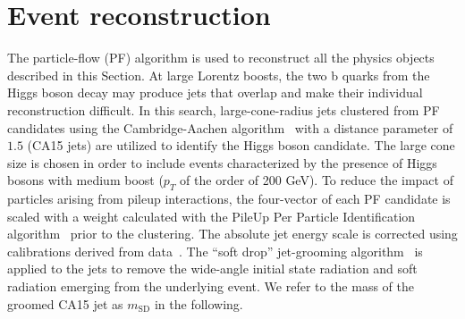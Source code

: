 


\section{Event reconstruction}

The particle-flow (PF) \cite{Sirunyan:2017ulk} algorithm is used to reconstruct all the physics objects described in this Section. At large Lorentz boosts, the two b quarks from the Higgs boson decay may produce jets that overlap and make their individual reconstruction difficult. In this search, large-cone-radius jets clustered from PF candidates using the Cambridge-Aachen algorithm~\cite{cajets} with a distance parameter of $1.5$ (CA15 jets) are utilized to identify the Higgs boson candidate.  The large cone size is chosen in order to include events characterized by the presence of Higgs bosons with medium boost ($p_T$ of the order of 200 GeV).
To reduce the impact of particles arising from pileup interactions,  the four-vector of each PF candidate is scaled with a weight calculated with the PileUp Per Particle Identification algorithm~\cite{puppi} prior to the clustering.
The absolute jet energy scale is corrected using calibrations derived from data~\cite{jec}.
The ``soft drop'' jet-grooming algorithm~\cite{msd} is applied to the jets to remove the wide-angle initial state radiation and soft radiation emerging from the underlying event. We refer to the mass of the groomed CA15 jet as $m_\text{SD}$ in the following. 

